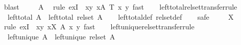\begin{isabellebody}
\ blast\isanewline
\ \ \isamarkupfalse%
\ \ A\ \isamarkupfalse%
\ {\isacharparenleft}{\kern0pt}rule\ exI\ {\isacharbrackleft}{\kern0pt}\ x{\isacharequal}{\kern0pt}{\isachardoublequoteopen}{\isacharbraceleft}{\kern0pt}y{\isachardot}{\kern0pt}\ {\isasymexists}x{\isasymin}A{\isachardot}{\kern0pt}\ T\ x\ y{\isacharbraceright}{\kern0pt}{\isachardoublequoteclose}{\isacharbrackright}{\kern0pt}{\isacharparenright}{\kern0pt}\ fast\isanewline
\ \ \isamarkupfalse%
%
\endisatagproof
{\isafoldproof}%
%
\isadelimproof
\isanewline
%
\endisadelimproof
\isanewline
{}\isamarkupfalse%
\ left{\isacharunderscore}{\kern0pt}total{\isacharunderscore}{\kern0pt}rel{\isacharunderscore}{\kern0pt}set{\isacharbrackleft}{\kern0pt}transfer{\isacharunderscore}{\kern0pt}rule{\isacharbrackright}{\kern0pt}{\isacharcolon}{\kern0pt}\ \isanewline
\ \ {\isachardoublequoteopen}left{\isacharunderscore}{\kern0pt}total\ A\ {\isasymLongrightarrow}\ left{\isacharunderscore}{\kern0pt}total\ {\isacharparenleft}{\kern0pt}rel{\isacharunderscore}{\kern0pt}set\ A{\isacharparenright}{\kern0pt}{\isachardoublequoteclose}\isanewline
%
\isadelimproof
\ \ %
\endisadelimproof
%
\isatagproof
{}\isamarkupfalse%
\ left{\isacharunderscore}{\kern0pt}total{\isacharunderscore}{\kern0pt}def\ rel{\isacharunderscore}{\kern0pt}set{\isacharunderscore}{\kern0pt}def\isanewline
\ \ \isamarkupfalse%
\ safe\isanewline
\ \ \isamarkupfalse%
\ \ X\ \isamarkupfalse%
\ {\isacharparenleft}{\kern0pt}rule\ exI\ {\isacharbrackleft}{\kern0pt}\ x{\isacharequal}{\kern0pt}{\isachardoublequoteopen}{\isacharbraceleft}{\kern0pt}y{\isachardot}{\kern0pt}\ {\isasymexists}x{\isasymin}X{\isachardot}{\kern0pt}\ A\ x\ y{\isacharbraceright}{\kern0pt}{\isachardoublequoteclose}{\isacharbrackright}{\kern0pt}{\isacharparenright}{\kern0pt}\ fast\isanewline
\ \ \isamarkupfalse%
%
\endisatagproof
{\isafoldproof}%
%
\isadelimproof
\isanewline
%
\endisadelimproof
\isanewline
{}\isamarkupfalse%
\ left{\isacharunderscore}{\kern0pt}unique{\isacharunderscore}{\kern0pt}rel{\isacharunderscore}{\kern0pt}set{\isacharbrackleft}{\kern0pt}transfer{\isacharunderscore}{\kern0pt}rule{\isacharbrackright}{\kern0pt}{\isacharcolon}{\kern0pt}\ \isanewline
\ \ {\isachardoublequoteopen}left{\isacharunderscore}{\kern0pt}unique\ A\ {\isasymLongrightarrow}\ left{\isacharunderscore}{\kern0pt}unique\ {\isacharparenleft}{\kern0pt}rel{\isacharunderscore}{\kern0pt}set\ A{\isacharparenright}{\kern0pt}{\isachardoublequoteclose}\isanewline

\end{isabellebody}
